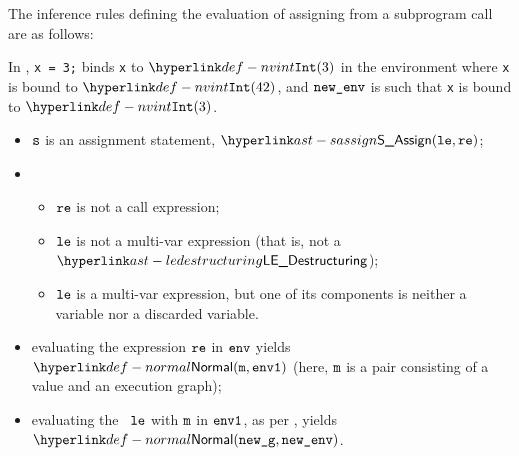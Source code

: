 The inference rules defining the evaluation of assigning
from a subprogram call are as follows:
\begin{mathpar}
\end{mathpar}

In ,
\texttt{x = 3;} binds \texttt{x} to $\nvint(3)$ in the environment where \texttt{x} is bound to
$\nvint(42)$, and $\newenv$ is such that \texttt{x} is bound to $\nvint(3)$.

\ProseParagraph
\AllApply
\begin{itemize}
  \item $\vs$ is an assignment statement, $\SAssign(\vle, \vre)$;
  \item \OneApplies
  \begin{itemize}
    \item $\vre$ is not a call expression;
    \item $\vle$ is not a multi-var expression (that is, not a $\LEDestructuring$);
    \item $\vle$ is a multi-var expression, but one of its components is neither a variable
          nor a discarded variable.
  \end{itemize}
  \item evaluating the expression $\vre$ in $\env$ yields
        $\Normal(\vm, \envone)$ (here, $\vm$ is a pair consisting of a value and an execution graph)\ProseOrAbnormal;
  \item evaluating the \assignableexpression\ $\vle$ with $\vm$ in $\envone$,
        as per , yields $\Normal(\newg, \newenv)$\ProseOrAbnormal.
\end{itemize}

